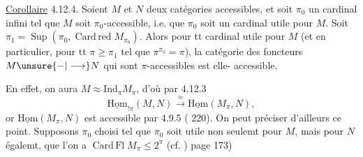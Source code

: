 \uline{Corollaire} 4.12.4. Soient $M$ et $N$ deux
catégories accessibles, et soit $\pi_0$ un cardinal
infini tel que $M$ soit $\pi_0$-accessible, i.e.
que $\pi_0$ soit un cardinal utile pour $M$.
Soit $\pi_1=\operatorname{Sup}(\pi_0,\operatorname{Card\,red}M_{\pi_0})$. Alors
pour tt cardinal  utile pour $M$
(et en particulier, pour tt $\pi\geq\pi_1$ tel
que $\pi^{\pi_0}=\pi$), la catégorie des foncteurs
$M\unsure{-|\longrightarrow}N$ qui sont $\pi$-accessibles est
elle-\unsure{$=$} accessible.

En effet, on aura $M\approx\mathrm{Ind}_\pi M_\pi$,
d'où par 4.12.3
\[
 \underline{\mathrm{Hom}}_{!\pi}(M,N)\xrightarrow{\approx}\underline{\mathrm{Hom}}(M_\pi,N),
\]
or $\underline{\mathrm{Hom}}(M_\pi,N)$ est accessible par
4.9.5 ( 220). On peut préciser
d'ailleurs ce point. Supposons $\pi_0$ choisi
tel que $\pi_0$ soit utile non seulemt pour
$M$, mais pour $N$ égalemt, 
que l'on a $\operatorname{Card\,Fl} M_\pi\leq 2^\pi$ (cf. )
page 173)


